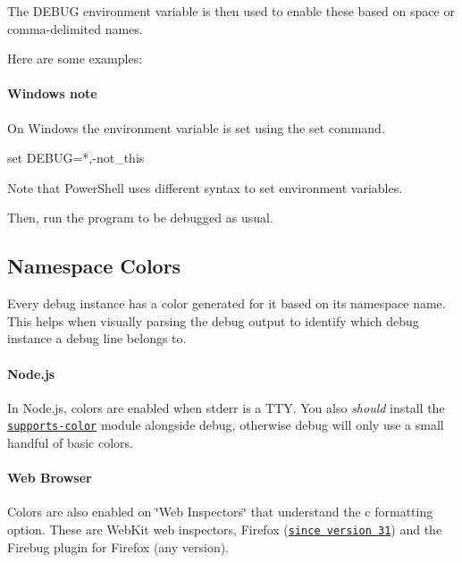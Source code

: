 The {\ttfamily D\+E\+B\+UG} environment variable is then used to enable these based on space or comma-\/delimited names.

Here are some examples\+:

  

\paragraph*{Windows note}

On Windows the environment variable is set using the {\ttfamily set} command.


\begin{DoxyCode}
set DEBUG=*,-not\_this
\end{DoxyCode}


Note that Power\+Shell uses different syntax to set environment variables.




Then, run the program to be debugged as usual.

\subsection*{Namespace Colors}

Every debug instance has a color generated for it based on its namespace name. This helps when visually parsing the debug output to identify which debug instance a debug line belongs to.

\paragraph*{Node.\+js}

In Node.\+js, colors are enabled when stderr is a T\+TY. You also {\itshape should} install the \href{https://npmjs.org/supports-color}{\tt {\ttfamily supports-\/color}} module alongside debug, otherwise debug will only use a small handful of basic colors.



\paragraph*{Web Browser}

Colors are also enabled on \char`\"{}\+Web Inspectors\char`\"{} that understand the {\ttfamily c} formatting option. These are Web\+Kit web inspectors, Firefox (\href{https://hacks.mozilla.org/2014/05/editable-box-model-multiple-selection-sublime-text-keys-much-more-firefox-developer-tools-episode-31/}{\tt since version 31}) and the Firebug plugin for Firefox (any version).



